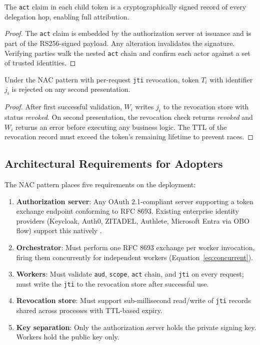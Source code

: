 \documentclass[journal]{IEEEtran}
\begin{document}
\begin{theorem}
The \texttt{act} claim in each child token is a cryptographically signed record
of every delegation hop, enabling full attribution.
\end{theorem}
\begin{proof}
The \texttt{act} claim is embedded by the authorization server at issuance and
is part of the RS256-signed payload. Any alteration invalidates the signature.
Verifying parties walk the nested \texttt{act} chain and confirm each actor
against a set of trusted identities.
\end{proof}

\begin{theorem}
Under the NAC pattern with per-request \texttt{jti} revocation, token $T_i$
with identifier $j_i$ is rejected on any second presentation.
\end{theorem}
\begin{proof}
After first successful validation, $W_i$ writes $j_i$ to the revocation store
with status \textit{revoked}. On second presentation, the revocation check
returns \textit{revoked} and $W_i$ returns an error before executing any
business logic. The TTL of the revocation record must exceed the token's
remaining lifetime to prevent races.
\end{proof}

\subsection{Architectural Requirements for Adopters}

The NAC pattern places five requirements on the deployment:

\begin{enumerate}
  \item \textbf{Authorization server}: Any OAuth 2.1-compliant server supporting
        a token exchange endpoint conforming to RFC 8693. Existing enterprise
        identity providers (Keycloak, Auth0, ZITADEL, Authlete, Microsoft Entra
        via OBO flow) support this natively \cite{rfc8693_deploy}.
  \item \textbf{Orchestrator}: Must perform one RFC 8693 exchange per worker
        invocation, firing them concurrently for independent workers
        (Equation~\ref{eq:concurrent}).
  \item \textbf{Workers}: Must validate \texttt{aud}, \texttt{scope},
        \texttt{act} chain, and \texttt{jti} on every request; must write the
        \texttt{jti} to the revocation store after successful use.
  \item \textbf{Revocation store}: Must support sub-millisecond read/write of
        \texttt{jti} records shared across processes with TTL-based expiry.
  \item \textbf{Key separation}: Only the authorization server holds the private
        signing key. Workers hold the public key only.
\end{enumerate}
\end{document}
